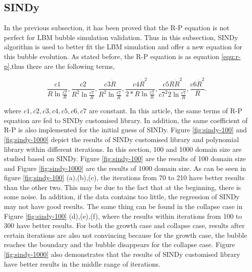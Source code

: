 \documentclass[review]{elsarticle}
\begin{document}
\subsection{SINDy}
In the previous subsection, it has been proved that the R-P equation is not perfect for LBM bubble simulation validation. Thus in this subsection, SINDy algorithm is used to better fit the LBM simulation and offer a new equation for this bubble evolution. As stated before, the R-P equation is as equation \ref{equ:r-p},thus there are the following terms,
\begin{linenomath*}
	\begin{equation}
		\frac{c 1}{R \ln \frac{c 7}{R}}, \frac{c 2}{R^2 \ln \frac{c 7}{R}}, \frac{c 3 \dot{R}}{R^2 \ln \frac{c 7}{R}}, \frac{c4\dot{R}^2}{2 * R \ln \frac{c 7}{R}}, \frac{c5 R \dot{R}^2}{c 7^2 2 \ln \frac{c 7}{R}}, \frac{c6 \dot{R}^2}{R}.
	\end{equation}
\end{linenomath*}
where $c1,c2,c3,c4,c5,c6,c7$ are constant. In this article, the same terms of R-P equation are fed to SINDy customised library. In addition, the same coefficient of R-P is also implemented for the initial guess of SINDy. Figure \ref{fig:sindy-100} and \ref{fig:sindy-1000} depict the results of SINDy customised library and polynomial library within different iterations. In this section, 100 and 1000 domain size are studied based on SINDy. Figure \ref{fig:sindy-100} are the results of 100 domain size and Figure \ref{fig:sindy-1000} are the results of 1000 domain size. As can be seen in figure \ref{fig:sindy-100} (a),(b),(c), the iterations from 70 to 210 have better results than the other two. This may be due to the fact that at the beginning, there is some noise. In addition, if the data contains too little, the regression of SINDy may not have good results. The same thing can be found in the collapse case in Figure \ref{fig:sindy-100} (d),(e),(f), where the results within iterations from 100 to 300 have better results. For both the growth case and collapse case, results after certain iterations are also not convincing because for the growth case, the bubble reaches the boundary and the bubble disappears for the collapse case. Figure \ref{fig:sindy-1000} also demonstrates that the results of SINDy customised library have better results in the middle range of iterations. 
\end{document}

